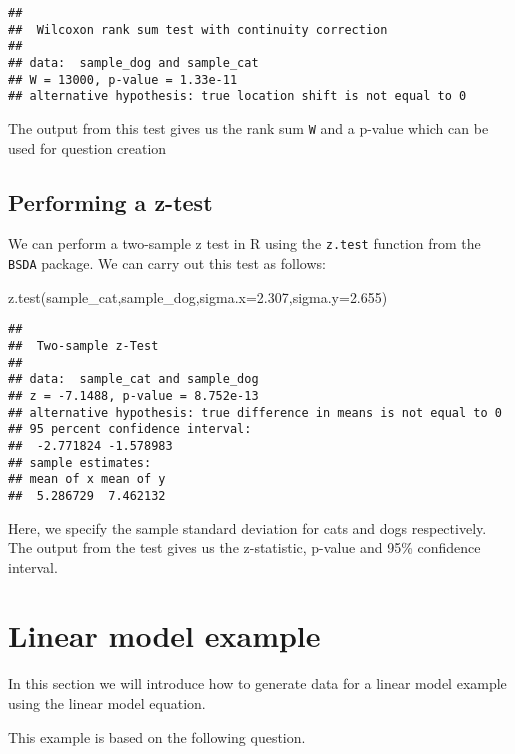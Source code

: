\documentclass[
]{book}
\newenvironment{Shaded}{\begin{snugshade}}{\end{snugshade}}
\newcommand{\AttributeTok}[1]{\textcolor[rgb]{0.77,0.63,0.00}{#1}}
\newcommand{\FloatTok}[1]{\textcolor[rgb]{0.00,0.00,0.81}{#1}}
\newcommand{\FunctionTok}[1]{\textcolor[rgb]{0.00,0.00,0.00}{#1}}
\newcommand{\NormalTok}[1]{#1}
\begin{document}
\begin{verbatim}
## 
##  Wilcoxon rank sum test with continuity correction
## 
## data:  sample_dog and sample_cat
## W = 13000, p-value = 1.33e-11
## alternative hypothesis: true location shift is not equal to 0
\end{verbatim}

The output from this test gives us the rank sum \texttt{W} and a p-value which can be used for question creation

\hypertarget{performing-a-z-test}{%
\section{Performing a z-test}\label{performing-a-z-test}}

We can perform a two-sample z test in R using the \texttt{z.test} function from the \texttt{BSDA} package. We can carry out this test as follows:

\begin{Shaded}
\begin{Highlighting}[]
\FunctionTok{z.test}\NormalTok{(sample\_cat,sample\_dog,}\AttributeTok{sigma.x=}\FloatTok{2.307}\NormalTok{,}\AttributeTok{sigma.y=}\FloatTok{2.655}\NormalTok{)}
\end{Highlighting}
\end{Shaded}

\begin{verbatim}
## 
##  Two-sample z-Test
## 
## data:  sample_cat and sample_dog
## z = -7.1488, p-value = 8.752e-13
## alternative hypothesis: true difference in means is not equal to 0
## 95 percent confidence interval:
##  -2.771824 -1.578983
## sample estimates:
## mean of x mean of y 
##  5.286729  7.462132
\end{verbatim}

Here, we specify the sample standard deviation for cats and dogs respectively. The output from the test gives us the z-statistic, p-value and 95\% confidence interval.

\hypertarget{linear-model-example}{%
\chapter{Linear model example}\label{linear-model-example}}

In this section we will introduce how to generate data for a linear model example using the linear model equation.

This example is based on the following question.
\end{document}
